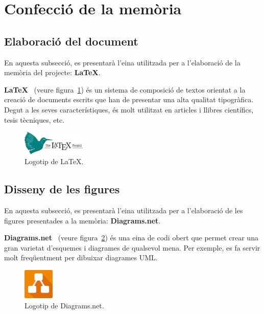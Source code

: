 \documentclass[a4paper,12pt]{ThesisStyle}
\begin{document}
\section{Confecció de la memòria}
\label{sec:decisions_memoria}

\subsection{Elaboració del document}
\label{subsec:decisions_memoria_document}

En aquesta subsecció, es presentarà l'eina utilitzada per a l'elaboració de la memòria del projecte: \textbf{LaTeX}.

\textbf{LaTeX}~\cite{LaTeX} (veure figura~\ref{img:logo_latex}) és un sistema de composició de textos orientat a la creació de documents escrits que han de presentar una alta qualitat tipogràfica. Degut a les seves característiques, és molt utilitzat en articles i llibres científics, tesis tècniques, etc.

\begin{figure}[H]
  \centering
  \includegraphics[width=0.27\textwidth]{assets/logos/LaTeX.png}
  \caption{\label{img:logo_latex}Logotip de LaTeX.}
\end{figure}

\subsection{Disseny de les figures}
\label{subsec:decisions_memoria_figures}

En aquesta subsecció, es presentarà l'eina utilitzada per a l'elaboració de les figures presentades a la memòria: \textbf{Diagrams.net}.

\textbf{Diagrams.net}~\cite{DiagramsNet} (veure figura~\ref{img:logo_diagrams}) és una eina de codi obert que permet crear una gran varietat d'esquemes i diagrames de qualsevol mena. Per exemple, es fa servir molt freqüentment per dibuixar diagrames UML.

\begin{figure}[H]
  \centering
  \includegraphics[width=0.13\textwidth]{assets/logos/diagramsNet.png}
  \caption{\label{img:logo_diagrams}Logotip de Diagrams.net.}
\end{figure}
\end{document}
